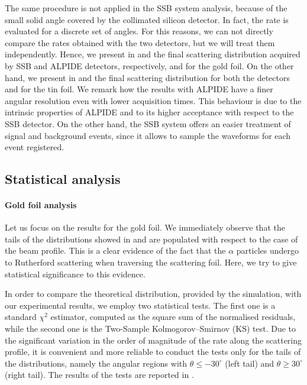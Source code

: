 \documentclass[../../main/main.tex]{subfiles}
\begin{document}
The same procedure is not applied in the SSB system analysis, because of the small solid angle covered by the collimated silicon detector. In fact, the rate is evaluated for a discrete set of angles.
For this reasons, we can not directly compare the rates obtained with the two detectors, but we will treat them independently.
Hence, we present in  and  the final scattering distribution acquired by SSB and ALPIDE detectors, respectively, and for the gold foil. On the other hand, we present in  and  the final scattering distribution for both the detectors and for the tin foil.
We remark how the results with ALPIDE have a finer angular resolution even with lower acquisition times. This behaviour is due to the intrinsic properties of ALPIDE and to its higher acceptance with respect to the SSB detector. On the other hand, the SSB system offers an easier treatment of signal and background events, since it allows to sample the waveforms for each event registered.



\subsection{Statistical analysis}


\paragraph{Gold foil analysis}
Let us focus on the results for the gold foil. We immediately observe that the tails of the distributions showed in  and  are populated with respect to the case of the beam profile. This is a clear evidence of the fact that the \( \alpha \) particles undergo to Rutherford scattering when traversing the scattering foil. Here, we try to give statistical significance to this evidence.

In order to compare the theoretical distribution, provided by the simulation, with our experimental results, we employ two statistical tests. The first one is a standard $\chi^2$ estimator, computed as the square sum of the normalised residuals, while the second one is the Two-Sample Kolmogorov–Smirnov (KS) test. Due to the significant variation in the order of magnitude of the rate along the scattering profile, it is convenient and more reliable to conduct the tests only for the tails of the distributions, namely the angular regions with \( \theta \leq-30^{\circ} \) (left tail) and \( \theta \geq 30^{\circ} \) (right tail). The results of the tests are reported in .
\end{document}
